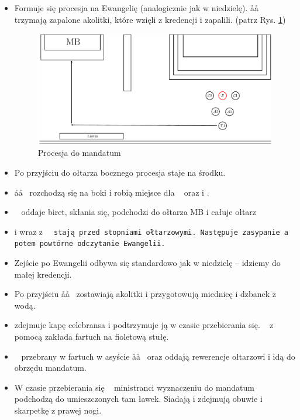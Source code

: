 \begin{itemize}
      \item Formuje się procesja na Ewangelię (analogicznie jak w niedzielę).
            \aa\aa~ trzymają zapalone akolitki, które wzięli z kredencji i
            zapalili. (patrz Rys. \ref{fig:mandatum})
            \begin{figure}[h!]
                  \centering
                  \includegraphics[width=0.8\linewidth]{Figures/Czwartek/Obmycie.pdf}
                  \caption{Procesja do mandatum}
                  \label{fig:mandatum}
            \end{figure}
      \item Po przyjściu do ołtarza bocznego procesja staje na środku.
      \item \aa\aa~ rozchodzą się na boki i robią miejsce dla \ii~ oraz  i .
      \item \ii~ oddaje biret, skłania się, podchodzi do ołtarza MB i całuje
            ołtarz
      \item {} i  wraz z \tt~ stają przed stopniami ołtarzowymi. Następuje
            zasypanie a potem powtórne odczytanie Ewangelii.
      \item Zejście po Ewangelii odbywa się standardowo jak w niedzielę --
            idziemy do małej kredencji.
      \item Po przyjściu \aa\aa~ zostawiają akolitki i przygotowują miednicę i
            dzbanek z wodą.
      \item {} zdejmuje kapę celebransa i podtrzymuje ją w czasie przebierania
            się. \ii~ z pomocą  zakłada fartuch na fioletową stułę.
      \item \ii~ przebrany w fartuch w asyście \aa\aa~ oraz  oddają
            rewerencje ołtarzowi i idą do obrzędu mandatum.
      \item W czasie przebierania się \ii~ ministranci wyznaczeniu do mandatum
            podchodzą do umieszczonych tam ławek. Siadają i zdejmują obuwie i
            skarpetkę z prawej nogi.

\end{itemize}
